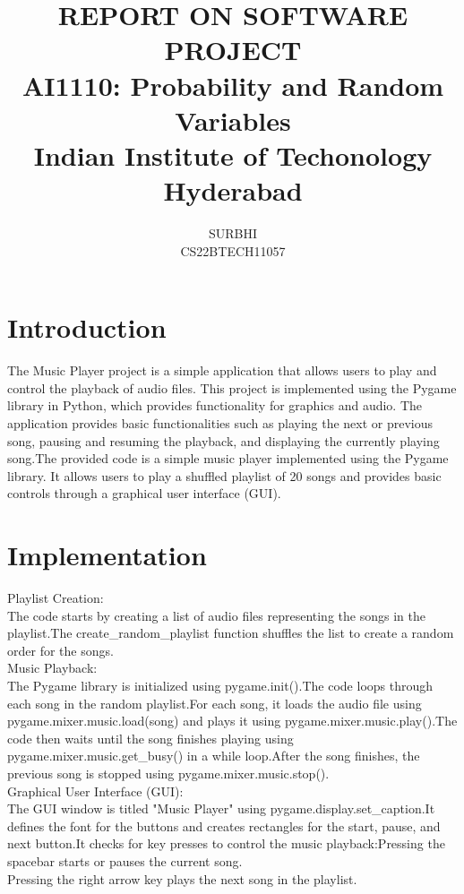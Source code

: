 \documentclass[journal,12pt,twocolumn]{IEEEtran}
\title{
\textbf {REPORT ON SOFTWARE PROJECT}\\ \large \textbf{AI1110}: Probability and Random Variables\\Indian Institute of Techonology Hyderabad
}
\author{SURBHI\\CS22BTECH11057}
\begin{document}
\maketitle

\section{Introduction}
The Music Player project is a simple application that allows users to play and control the playback of audio files. This project is implemented using the Pygame library in Python, which provides functionality for graphics and audio. The application provides basic functionalities such as playing the next or previous song, pausing and resuming the playback, and displaying the currently playing song.The provided code is a simple music player implemented using the Pygame library. It allows users to play a shuffled playlist of 20 songs and provides basic controls through a graphical user interface (GUI).

\section{Implementation}
Playlist Creation:\\
The code starts by creating a list of audio files representing the songs in the playlist.The create\_random\_playlist function shuffles the list to create a random order for the songs.\\

Music Playback:\\
The Pygame library is initialized using pygame.init().The code loops through each song in the random playlist.For each song, it loads the audio file using pygame.mixer.music.load(song) and plays it using pygame.mixer.music.play().The code then waits until the song finishes playing using pygame.mixer.music.get\_busy() in a while loop.After the song finishes, the previous song is stopped using pygame.mixer.music.stop().\\

Graphical User Interface (GUI):\\
The GUI window is titled "Music Player" using pygame.display.set\_caption.It defines the font for the buttons and creates rectangles for the start, pause, and next button.It checks for key presses to control the music playback:Pressing the spacebar starts or pauses the current song.\\
Pressing the right arrow key plays the next song in the playlist.\\
\end{document}
